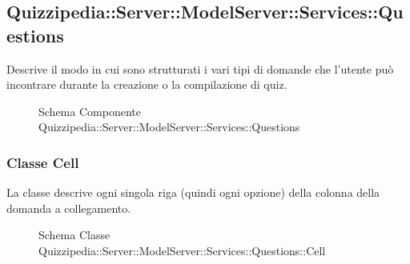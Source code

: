 \subsection{Quizzipedia::Server::ModelServer::Services::Questions}
Descrive il modo in cui sono strutturati i vari tipi di domande che l'utente può incontrare durante la creazione o la compilazione di quiz.
\begin{figure}[H]
\centering
\noindent{}
\caption[Quizzipedia::Server::ModelServer::Services::Questions]{Schema Componente Quizzipedia::Server::ModelServer::Services::Questions}
\end{figure}
\subsubsection{Classe Cell}
La classe descrive ogni singola riga (quindi ogni opzione) della colonna della domanda a collegamento.
\begin{figure}[H]
\centering
\noindent{}
\caption{Schema Classe Quizzipedia::Server::ModelServer::Services::Questions::Cell}
\end{figure}
